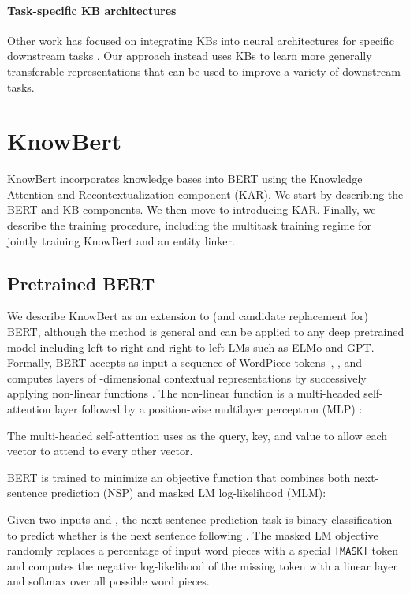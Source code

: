 \documentclass[11pt,a4paper]{article}
\newcommand{\KB}[0]{KnowBert}
\newcommand{\KBS}[0]{KnowBert }
\begin{document}
\paragraph{Task-specific KB architectures}
Other work has focused on integrating KBs into neural architectures for specific downstream tasks \cite{Yang2017LeveragingKB,Sun2018OpenDQ,chen2017neural,Bauer2018CommonsenseFG,Mihaylov2018KnowledgeableRE,Wang2019ExplicitUO,yang-etal-2019-enhancing-pre}.
Our approach instead uses KBs to learn more generally transferable representations that can be used to improve a variety of downstream tasks.


\section{\KB}

\KBS incorporates knowledge bases into BERT using the Knowledge Attention and Recontextualization component (KAR).
We start by describing the BERT and KB components. 
We then move to introducing KAR.
Finally, we describe the training procedure, including the multitask training regime for jointly training \KBS and an entity linker.

\subsection{Pretrained BERT}

We describe \KBS as an extension to (and candidate replacement for) BERT, although the method is general and can be applied to any deep pretrained model including left-to-right and right-to-left LMs such as ELMo and GPT.
Formally, BERT accepts as input a sequence of  WordPiece tokens~\cite{sennrich-etal-2016-neural,wu2016google},
, and computes  layers of -dimensional contextual representations
 by successively applying non-linear functions . 
The non-linear function is a multi-headed self-attention layer followed by a position-wise multilayer perceptron (MLP) \cite{Vaswani2017AttentionIA}:

The multi-headed self-attention uses  as the query, key, and value to allow each vector to attend to every other vector.

BERT is trained to minimize an objective function that combines both next-sentence prediction (NSP) and masked LM log-likelihood (MLM):

Given two inputs  and , the next-sentence prediction task is binary classification to predict whether  is the next sentence following .
The masked LM objective randomly replaces a percentage of input word pieces with a special \texttt{[MASK]} token and computes the negative log-likelihood of the missing token with a linear layer and softmax over all possible word pieces.
\end{document}
